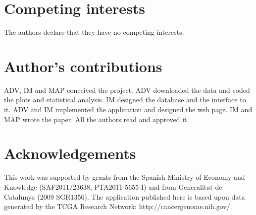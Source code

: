 \documentclass{bmcart}
\begin{document}
\begin{backmatter}

\section*{Competing interests}
  The authors declare that they have no competing interests.

\section*{Author's contributions}
   ADV, IM and MAP conceived the project. ADV downloaded the data and coded the plots and statistical analysis. IM designed the database and the interface to it. ADV and IM implemented the application and designed the web page. IM and MAP wrote the paper. All the authors read and approved it.

\section*{Acknowledgements}
This work was supported by grants from the Spanish Ministry of Economy and Knowledge (SAF2011/23638, PTA2011-5655-I) and from Generalitat de Catalunya (2009 SGR1356). The application published here is based upon data generated by the TCGA Research Network: http://cancergenome.nih.gov/. 





% 



\end{backmatter}
\end{document}
